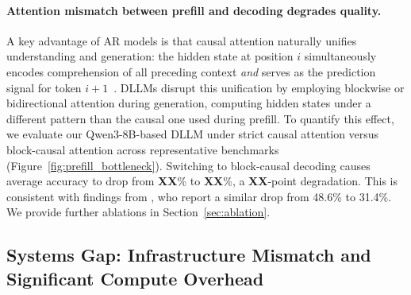 \paragraph{Attention mismatch between prefill and decoding degrades quality.}
A key advantage of AR models is that causal attention naturally unifies understanding and generation: the hidden state at position $i$ simultaneously encodes comprehension of all preceding context \emph{and} serves as the prediction signal for token $i{+}1$~\citep{wang2022zeroshot, fu2023decoderonly, behnamghader2024llm2vec}. DLLMs disrupt this unification by employing blockwise or bidirectional attention during generation, computing hidden states under a different pattern than the causal one used during prefill. To quantify this effect, we evaluate our Qwen3-8B-based DLLM under strict causal attention versus block-causal attention across representative benchmarks (Figure~\ref{fig:prefill_bottleneck}). Switching to block-causal decoding causes average accuracy to drop from \textbf{XX}\% to \textbf{XX}\%, a \textbf{XX}-point degradation. This is consistent with findings from \citet{nbdiff2025}, who report a similar drop from 48.6\% to 31.4\%. We provide further ablations in Section~\ref{sec:ablation}.

\subsection{Systems Gap: Infrastructure Mismatch and Significant Compute Overhead}
\label{sec:mot_systems}

